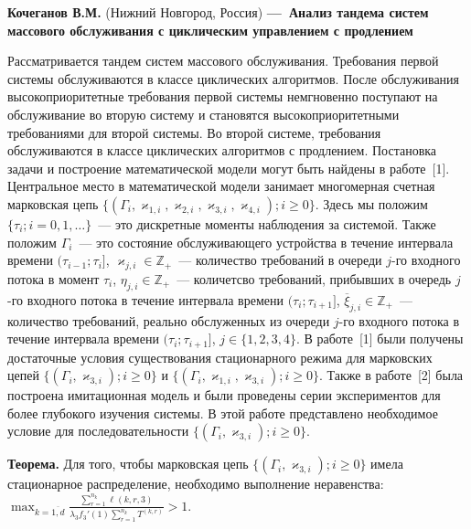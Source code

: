 \documentclass{article}
\begin{document}
\makeatletter
\renewcommand{\@makefnmark}{}
\makeatother

%

{\bf Кочеганов В.М.} (Нижний Новгород, Россия) {\bf ---~Анализ тандема систем массового обслуживания с циклическим управлением с продлением}   

Рассматривается тандем систем массового обслуживания.  Требования первой системы обслуживаются в классе циклических алгоритмов. После обслуживания высокоприоритетные требования первой системы немгновенно поступают на обслуживание во вторую систему и становятся высокоприоритетными требованиями для второй системы. Во второй системе, требования обслуживаются в классе циклических алгоритмов с продлением.  Постановка задачи и построение математической модели могут быть найдены в работе~[1]. Центральное место в математической модели занимает многомерная счетная марковская цепь ${\{(\Gamma_i, \varkappa_{1,i}, \varkappa_{2,i}, \varkappa_{3,i}, \varkappa_{4,i});  i \geqslant 0\}}$. Здесь мы положим $\{\tau_i; i = 0, 1,\ldots\}$~--- это дискретные моменты наблюдения за системой. Также положим
$\Gamma_i$~--- это состояние обслуживающего устройства в течение интервала времени $(\tau_{i-1};\tau_i]$, $\varkappa_{j,i} \in \mathbb{Z}_+ $~--- количество требований в очереди $j$-го входного потока в момент $\tau_i$, $\eta_{j,i} \in \mathbb{Z}_+$~--- количетсво требований, прибывших в очередь $j$-го входного потока в течение интервала времени $(\tau_{i};\tau_{i+1}]$,  $\overline{\xi}_{j,i}\in \mathbb{Z}_+$~--- количество требований, реально обслуженных из очереди $j$-го входного потока в течение интервала времени $(\tau_{i};\tau_{i+1}]$, $j\in
\{1,2,3,4\}$. В работе~[1] были получены достаточные условия  существования стационарного режима для марковских цепей ${\{(\Gamma_i, \varkappa_{3,i});  i \geqslant 0\}}$ и ${\{(\Gamma_i, \varkappa_{1,i}, \varkappa_{3,i});  i \geqslant 0\}}$.  Также в работе~[2] была построена имитационная модель и были проведены серии экспериментов для более глубокого изучения системы.  В этой работе представлено необходимое условие для последовательности ${\{(\Gamma_i, \varkappa_{3,i});  i \geqslant 0\}}$.

{\bf Теорема.} Для того,  чтобы марковская цепь ${\{(\Gamma_i, \varkappa_{3,i});  i \geqslant 0\}}$ имела стационарное распределение,  необходимо выполнение неравенства:
$
\max_{k=\overline{1, d}} { \frac{\sum_{r = 1}^{n_{k}}\ell(k, r, 3)}{\lambda_3 f_3'(1) \sum_{r = 1}^{n_k} T^{(k, r)}} } >1.
$
\end{document}
